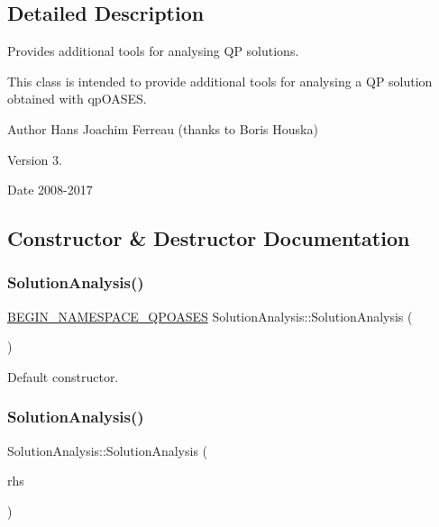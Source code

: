 \subsection{Detailed Description}
Provides additional tools for analysing QP solutions. 

This class is intended to provide additional tools for analysing a QP solution obtained with qp\+O\+A\+S\+ES.

\begin{DoxyAuthor}{Author}
Hans Joachim Ferreau (thanks to Boris Houska) 
\end{DoxyAuthor}
\begin{DoxyVersion}{Version}
3. 
\end{DoxyVersion}
\begin{DoxyDate}{Date}
2008-\/2017 
\end{DoxyDate}


\subsection{Constructor \& Destructor Documentation}
\mbox{\label{class_solution_analysis_a8c1dcc27cb1adc87c518984350d9d97b}} 
\subsubsection{\texorpdfstring{Solution\+Analysis()}{SolutionAnalysis()}\hspace{0.1cm}{\footnotesize\ttfamily [1/2]}}
{\footnotesize\ttfamily \hyperlink{_types_8hpp_afd127fcb3c8f47975e9fa0ec2bacde52}{B\+E\+G\+I\+N\+\_\+\+N\+A\+M\+E\+S\+P\+A\+C\+E\+\_\+\+Q\+P\+O\+A\+S\+ES} Solution\+Analysis\+::\+Solution\+Analysis (\begin{DoxyParamCaption}{ }\end{DoxyParamCaption})}

Default constructor. \mbox{\label{class_solution_analysis_aade7aa6f4702f7417c0c2c4d836b52e1}} 
\subsubsection{\texorpdfstring{Solution\+Analysis()}{SolutionAnalysis()}\hspace{0.1cm}{\footnotesize\ttfamily [2/2]}}
{\footnotesize\ttfamily Solution\+Analysis\+::\+Solution\+Analysis (\begin{DoxyParamCaption}\item[{const \hyperlink{class_solution_analysis}{Solution\+Analysis} \&}]{rhs }\end{DoxyParamCaption})}

